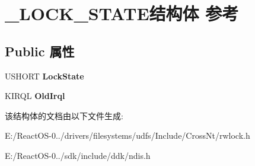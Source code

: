 \hypertarget{struct___l_o_c_k___s_t_a_t_e}{}\section{\+\_\+\+L\+O\+C\+K\+\_\+\+S\+T\+A\+T\+E结构体 参考}
\label{struct___l_o_c_k___s_t_a_t_e}
\subsection*{Public 属性}
\begin{DoxyCompactItemize}
\item 
\mbox{\label{struct___l_o_c_k___s_t_a_t_e_a1a1ef1fb66e1ae81ad4f9960a6ca52da}} 
U\+S\+H\+O\+RT {\bfseries Lock\+State}
\item 
\mbox{\label{struct___l_o_c_k___s_t_a_t_e_a8dd6b07f66378f063985ebfc72e9d15d}} 
K\+I\+R\+QL {\bfseries Old\+Irql}
\end{DoxyCompactItemize}


该结构体的文档由以下文件生成\+:\begin{DoxyCompactItemize}
\item 
E\+:/\+React\+O\+S-\/0../drivers/filesystems/udfs/\+Include/\+Cross\+Nt/rwlock.\+h\item 
E\+:/\+React\+O\+S-\/0../sdk/include/ddk/ndis.\+h\end{DoxyCompactItemize}
